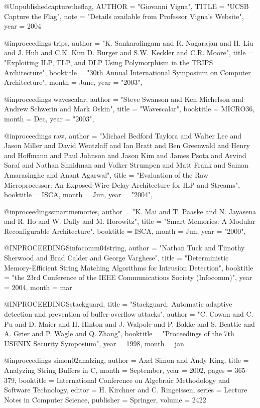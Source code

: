 @Unpublished{capturetheflag,
        AUTHOR = "Giovanni Vigna",
        TITLE = "{UCSB} Capture the Flag",
        note = "Details available from Professor Vigna's Website",
        year = 2004
}


@inproceedings{ trips,
	author = "K. Sankaralingam and R. Nagarajan and H. Liu and J. Huh and C.K. Kim D. Burger and S.W. Keckler and C.R. Moore",
	title = "Exploiting {ILP}, {TLP}, and {DLP} Using Polymorphism in the {TRIPS} Architecture",
	booktitle = "30th Annual International Symposium on Computer Architecture",
	month = June,
	year = "2003",
}

@inproceedings{ wavescalar,
	author = "Steve Swanson and Ken Michelson and Andrew Schwerin and Mark Oskin",
	title = "Wavescalar",
	booktitle = MICRO36,
	month = Dec,
	year = "2003",
}

@inproceedings{ raw,
	author = "Michael Bedford Taylora and Walter Lee and Jason Miller and David Wentzlaff and Ian Bratt and Ben Greenwald and Henry and Hoffmann and Paul Johnson and Jason Kim and James Psota and Arvind Saraf and Nathan Shnidman and Volker Strumpen and Matt Frank and Saman Amarasinghe and Anant Agarwal",
	title = "Evaluation of the {R}aw Microprocessor: An Exposed-Wire-Delay Architecture for {ILP} and Streams",
	booktitle = ISCA,
	month = Jun,
	year = "2004",
}

@inproceedings{smartmemories,
	author = "K. Mai and  T. Paaske and N. Jayasena and R. Ho and W. Dally and M. Horowitz",
	title = "Smart Memories: A Modular Reconfigurable Architecture",
	booktitle = ISCA,
	month = Jun,
	year = "2000",
}

@INPROCEEDINGS{infocomm04string,
           author = "Nathan Tuck and Timothy Sherwood and Brad Calder and George Varghese",
           title = "Deterministic Memory-Efficient String Matching Algorithms for Intrusion Detection",
           booktitle = "the 23rd Conference of the IEEE Communications Society (Infocomm)",
           year = 2004,
	   month = mar
}


@INPROCEEDINGS{stackguard,
           title = "Stackguard: Automatic adaptive detection and prevention of buffer-overflow attacks",
           author = "C. Cowan and C. Pu and D. Maier and H. Hinton and J. Walpole and P. Bakke and S. Beattie and A. Grier and P. Wagle and Q. Zhang",
           booktitle = "Proceedings of the 7th USENIX Security Symposium",
           year = 1998,
	   month = jan
}

@inproceedings{ simon02analzing,
	author = {Axel Simon and Andy King},
	title = {Analyzing {S}tring {B}uffers in {C}},
	month = {September},
	year = {2002},
	pages = {365-379},
	booktitle = {International Conference on Algebraic Methodology and Software Technology},
	editor = {H. Kirchner and C. Ringeissen},
	series = {Lecture Notes in Computer Science},
	publisher = {Springer},
	volume = {2422} 
}

